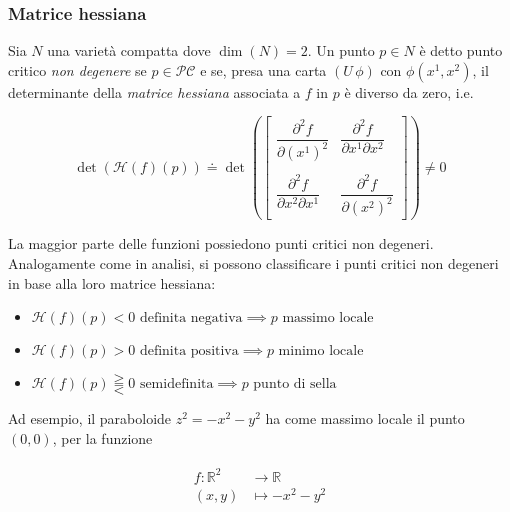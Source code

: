 \subsubsection{Matrice hessiana}

Sia $ N $ una varietà compatta dove $ \dim(N)=2 $. Un punto $ p \in N $  è detto punto critico \textit{non degenere} se $ p \in \mathcal{PC} $ e se, presa una carta $ (U\,\phi) $ con $ \phi (x^{1},x^{2}) $, il determinante della \textit{matrice hessiana} associata a $ f $ in $ p $ è diverso da zero, i.e.

\begin{equation}
	\det(\mathcal{H}(f)(p)) \doteq \det (\begin{bmatrix} \dfrac{\partial^{2} f}{\partial (x^{1})^{2}} & \dfrac{\partial^{2} f}{\partial x^{1} \partial x^{2}} \\\\ \dfrac{\partial^{2} f}{\partial x^{2} \partial x^{1}} & \dfrac{\partial^{2} f}{\partial (x^{2})^{2}} \end{bmatrix}) \neq 0
\end{equation}

La maggior parte delle funzioni possiedono punti critici non degeneri.\\
Analogamente come in analisi, si possono classificare i punti critici non degeneri in base alla loro matrice hessiana:

\begin{itemize}
	\item $ \mathcal{H}(f)(p) < 0 \text{ definita negativa} \implies p \text{ massimo locale} $
	
	\item $ \mathcal{H}(f)(p) > 0 \text{ definita positiva} \implies p \text{ minimo locale} $
	
	\item $ \mathcal{H}(f)(p) \gtreqqless 0 \text{ semidefinita} \implies p \text{ punto di sella} $
\end{itemize}

Ad esempio, il paraboloide $ z^{2} = - x^{2} - y^{2} $ ha come massimo locale il punto $ (0,0) $, per la funzione

\begin{align}
	\begin{split}
		f : \mathbb{R}^{2} &\to \mathbb{R}\\
		(x,y) &\mapsto - x^{2} - y^{2}
	\end{split}
\end{align}


